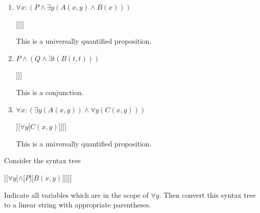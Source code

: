 \begin{solutions}
	\begin{enumerate}
		\item $\forall x:  (P \wedge \exists y (A(x,y) \wedge B(x)))$
		
		\begin{center}
			\begin{forest}
				[\(\forall x\)[\(\wedge\)[\(P\)][\(\exists y\)[\(\wedge\)[\({A(x,y)}\)][\(B(x)\)]]]]]
			\end{forest}
			This is a universally quantified proposition.
		\end{center}
	

	
		\item $P \wedge (Q \wedge \exists t (B(t,t)) )$
		
		\begin{center}
			\begin{forest}
				[\(\wedge\)[\(P\)][\(\wedge\)[\(Q\)][\(\exists t\)[\({B(t,t)}\)]]]]
			\end{forest}
		
		This is a conjunction.
		
		\end{center}
		\item $\forall x: ( \exists y (A(x,y)) \wedge \forall y (C(x,y)))$
		
		\begin{center}
			\begin{forest}
				[\(\forall x\)[\(\wedge\)[\(\exists y\)[\({A(x,y)}\)]][\(\forall y\)[\({C(x,y)}\)]]]]
			\end{forest}
		
		This is a universally quantified proposition.
		\end{center}
		
	\end{enumerate}
\end{solutions}

\begin{xca}
	Consider the syntax tree
	
	\begin{center}
		\begin{forest}
			[$\forall x$[$\wedge$[$\exists y$[${A(x,y)}$]][$\forall y$[$\wedge$[$P$][${B(x,y)}$]]]]]
		\end{forest}
	\end{center}
	
	Indicate all variables which are in the scope of $\forall y$.  Then convert this syntax tree to a linear string with appropriate parentheses. 
	
\end{xca}

